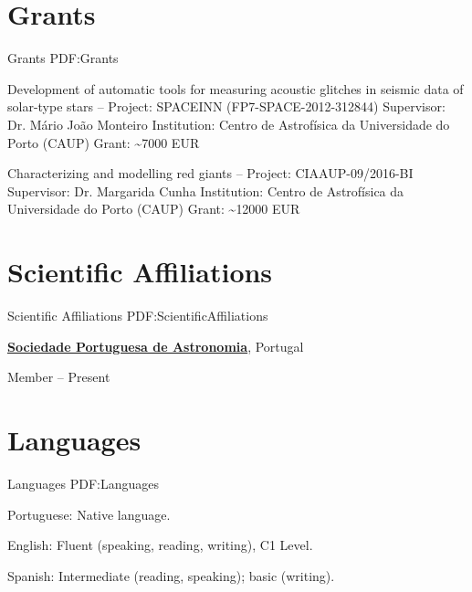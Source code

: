 \documentclass[letterpaper,10pt,oneside]{article}
\begin{document}
\begin{body}

\section
{Grants}
{Grants}
{PDF:Grants}

Development of automatic tools for measuring acoustic glitches in seismic data of solar-type stars
\hfill
{} --
\BulletItem
Project: SPACEINN (FP7-SPACE-2012-312844)
\BulletItem
Supervisor: Dr. Mário João Monteiro
\BulletItem
Institution: Centro de Astrofísica da Universidade do Porto (CAUP)
\BulletItem
Grant: \textasciitilde 7000 EUR


\BigGap
​Characterizing and modelling red giants
\hfill
{} --
\BulletItem
Project: ​CIAAUP-09/2016-BI
\BulletItem
Supervisor: Dr. Margarida Cunha
\BulletItem
Institution: Centro de Astrofísica da Universidade do Porto (CAUP)
\BulletItem
Grant: \textasciitilde 12000 EUR



\section
{Scientific Affiliations}
{Scientific Affiliations}
{PDF:ScientificAffiliations}

\href{http://www.sp-astronomia.pt/}
{\textbf{Sociedade Portuguesa de Astronomia}},
Portugal

\GapNoBreak
\BulletItem
Member
\hfill
{} --
Present


\section
{Languages}
{Languages}
{PDF:Languages}

\BulletItem
Portuguese: Native language.

\GapNoBreak
\BulletItem
English: Fluent (speaking, reading, writing), C1 Level.

\GapNoBreak
\BulletItem
Spanish: Intermediate (reading, speaking); basic (writing).



\end{body}
\end{document}
